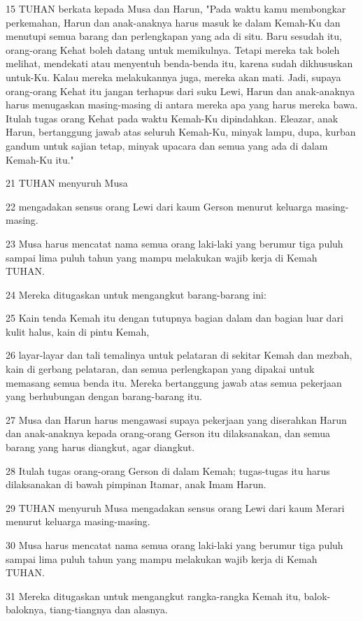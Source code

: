 \par 15 TUHAN berkata kepada Musa dan Harun, "Pada waktu kamu membongkar perkemahan, Harun dan anak-anaknya harus masuk ke dalam Kemah-Ku dan menutupi semua barang dan perlengkapan yang ada di situ. Baru sesudah itu, orang-orang Kehat boleh datang untuk memikulnya. Tetapi mereka tak boleh melihat, mendekati atau menyentuh benda-benda itu, karena sudah dikhususkan untuk-Ku. Kalau mereka melakukannya juga, mereka akan mati. Jadi, supaya orang-orang Kehat itu jangan terhapus dari suku Lewi, Harun dan anak-anaknya harus menugaskan masing-masing di antara mereka apa yang harus mereka bawa. Itulah tugas orang Kehat pada waktu Kemah-Ku dipindahkan. Eleazar, anak Harun, bertanggung jawab atas seluruh Kemah-Ku, minyak lampu, dupa, kurban gandum untuk sajian tetap, minyak upacara dan semua yang ada di dalam Kemah-Ku itu."
\par 21 TUHAN menyuruh Musa
\par 22 mengadakan sensus orang Lewi dari kaum Gerson menurut keluarga masing-masing.
\par 23 Musa harus mencatat nama semua orang laki-laki yang berumur tiga puluh sampai lima puluh tahun yang mampu melakukan wajib kerja di Kemah TUHAN.
\par 24 Mereka ditugaskan untuk mengangkut barang-barang ini:
\par 25 Kain tenda Kemah itu dengan tutupnya bagian dalam dan bagian luar dari kulit halus, kain di pintu Kemah,
\par 26 layar-layar dan tali temalinya untuk pelataran di sekitar Kemah dan mezbah, kain di gerbang pelataran, dan semua perlengkapan yang dipakai untuk memasang semua benda itu. Mereka bertanggung jawab atas semua pekerjaan yang berhubungan dengan barang-barang itu.
\par 27 Musa dan Harun harus mengawasi supaya pekerjaan yang diserahkan Harun dan anak-anaknya kepada orang-orang Gerson itu dilaksanakan, dan semua barang yang harus diangkut, agar diangkut.
\par 28 Itulah tugas orang-orang Gerson di dalam Kemah; tugas-tugas itu harus dilaksanakan di bawah pimpinan Itamar, anak Imam Harun.
\par 29 TUHAN menyuruh Musa mengadakan sensus orang Lewi dari kaum Merari menurut keluarga masing-masing.
\par 30 Musa harus mencatat nama semua orang laki-laki yang berumur tiga puluh sampai lima puluh tahun yang mampu melakukan wajib kerja di Kemah TUHAN.
\par 31 Mereka ditugaskan untuk mengangkut rangka-rangka Kemah itu, balok-baloknya, tiang-tiangnya dan alasnya.
